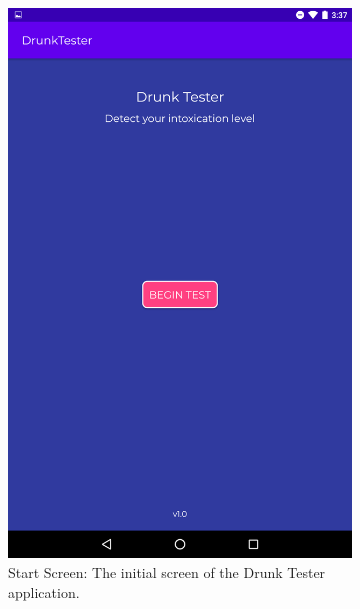 \documentclass[12pt,a4paper]{article}
\begin{document}
\begin{figure}[htb!]
    \centering
    \begin{subfigure}[b]{0.35\textwidth}
        \includegraphics[width=\textwidth]{materials/Start_screen.png}
        \caption*{Start Screen: The initial screen of the Drunk Tester application.}
    \end{subfigure}
    \hfill
    \begin{subfigure}[b]{0.35\textwidth}

\end{subfigure}
\end{figure}
\end{document}

